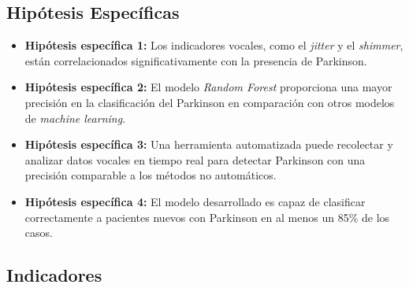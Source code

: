 \documentclass[listof=nochaptergap,12pt,times,authoryear]{report}
\begin{document}
\subsection{Hipótesis Específicas}
\begin{itemize}
    \item \textbf{Hipótesis específica 1:} Los indicadores vocales, como el \textit{jitter} y el \textit{shimmer}, están correlacionados significativamente con la presencia de Parkinson.
    
    \item \textbf{Hipótesis específica 2:} El modelo \textit{Random Forest} proporciona una mayor precisión en la clasificación del Parkinson en comparación con otros modelos de \textit{machine learning}.
    
    \item \textbf{Hipótesis específica 3:} Una herramienta automatizada puede recolectar y analizar datos vocales en tiempo real para detectar Parkinson con una precisión comparable a los métodos no automáticos.
    
    \item \textbf{Hipótesis específica 4:} El modelo desarrollado es capaz de clasificar correctamente a pacientes nuevos con Parkinson en al menos un 85\% de los casos.
\end{itemize}
\subsection{Indicadores}
\end{document}
